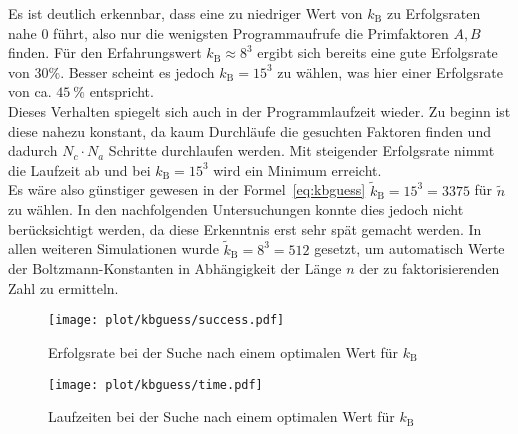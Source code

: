 Es ist deutlich erkennbar, dass eine zu niedriger Wert von $k_\mathrm{B}$ zu Erfolgsraten nahe $0$ führt, also nur die wenigsten Programmaufrufe die Primfaktoren $A,B$ finden. Für den Erfahrungswert $k_\mathrm{B}\approx 8^3$ ergibt sich bereits eine gute Erfolgsrate von $30\%$. Besser scheint es jedoch $k_\mathrm{B}=15^3$ zu wählen, was hier einer Erfolgsrate von ca. $\SI{45}{\percent}$ entspricht. \\
Dieses Verhalten spiegelt sich auch in der Programmlaufzeit wieder. Zu beginn ist diese nahezu konstant, da kaum Durchläufe die gesuchten Faktoren finden und dadurch $N_c\cdot N_a$ Schritte durchlaufen werden. Mit steigender Erfolgsrate nimmt die Laufzeit ab und bei $k_\mathrm{B}=15^3$ wird ein Minimum erreicht. \\
Es wäre also günstiger gewesen in der Formel~\eqref{eq:kbguess} $\tilde{k}_\mathrm{B}=15^3=3375$ für $\tilde{n}$ zu wählen. In den nachfolgenden Untersuchungen konnte dies jedoch nicht berücksichtigt werden, da diese Erkenntnis erst sehr spät gemacht werden. In allen weiteren Simulationen wurde $\tilde{k}_\mathrm{B}=8^3=512$ gesetzt, um automatisch Werte der Boltzmann-Konstanten in Abhängigkeit der Länge $n$ der zu faktorisierenden Zahl zu ermitteln.
\begin{figure}[ht]
		\centering
		\texttt{[image: plot/kbguess/success.pdf]}
		\caption{Erfolgsrate bei der Suche nach einem optimalen Wert für $k_\mathrm{B}$}\label{fig:kbguess-success}
\end{figure}
\begin{figure}[ht]
		\centering
		\texttt{[image: plot/kbguess/time.pdf]}
		\caption{Laufzeiten bei der Suche nach einem optimalen Wert für $k_\mathrm{B}$}\label{fig:kbguess-runtime}
\end{figure}

